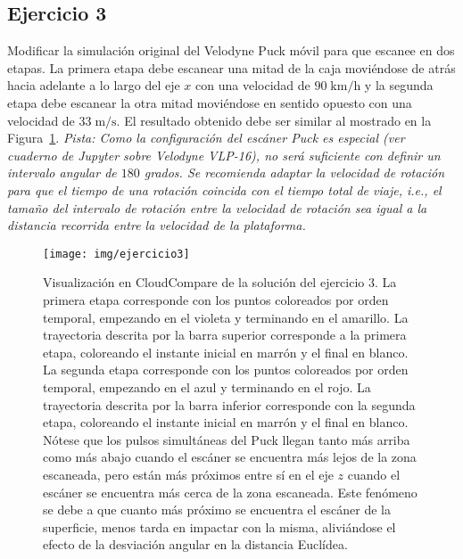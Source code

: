 \documentclass[]{article}
\begin{document}
	\subsection*{Ejercicio 3}
	Modificar la simulación original del Velodyne Puck móvil para que escanee en dos etapas. La primera etapa debe escanear una mitad de la caja moviéndose de atrás hacia adelante a lo largo del eje $x$ con una velocidad de $90\;\mathrm{km}/\mathrm{h}$ y la segunda etapa debe escanear la otra mitad moviéndose en sentido opuesto con una velocidad de $33\;\mathrm{m}/\mathrm{s}$. El resultado obtenido debe ser similar al mostrado en la Figura~\ref{fig:ejercicio3}. \textit{Pista: Como la configuración del escáner Puck es especial (ver cuaderno de Jupyter sobre Velodyne VLP-16), no será suficiente con definir un intervalo angular de $180$ grados. Se recomienda adaptar la velocidad de rotación para que el tiempo de una rotación coincida con el tiempo total de viaje, i.e., el tamaño del intervalo de rotación entre la velocidad de rotación sea igual a la distancia recorrida entre la velocidad de la plataforma.}
	
	\begin{figure}[htb]
		\centering
		\texttt{[image: img/ejercicio3]}
		\caption{Visualización en CloudCompare de la solución del ejercicio 3. La primera etapa corresponde con los puntos coloreados por orden temporal, empezando en el violeta y terminando en el amarillo. La trayectoria descrita por la barra superior corresponde a la primera etapa, coloreando el instante inicial en marrón y el final en blanco. La segunda etapa corresponde con los puntos coloreados por orden temporal, empezando en el azul y terminando en el rojo. La trayectoria descrita por la barra inferior corresponde con la segunda etapa, coloreando el instante inicial en marrón y el final en blanco. Nótese que los pulsos simultáneas del Puck llegan tanto más arriba como más abajo cuando el escáner se encuentra más lejos de la zona escaneada, pero están más próximos entre sí en el eje $z$ cuando el escáner se encuentra más cerca de la zona escaneada. Este fenómeno se debe a que cuanto más próximo se encuentra el escáner de la superficie, menos tarda en impactar con la misma, aliviándose el efecto de la desviación angular en la distancia Euclídea.}
		\label{fig:ejercicio3}
	\end{figure} 

	
	\pagebreak


	
\end{document}

